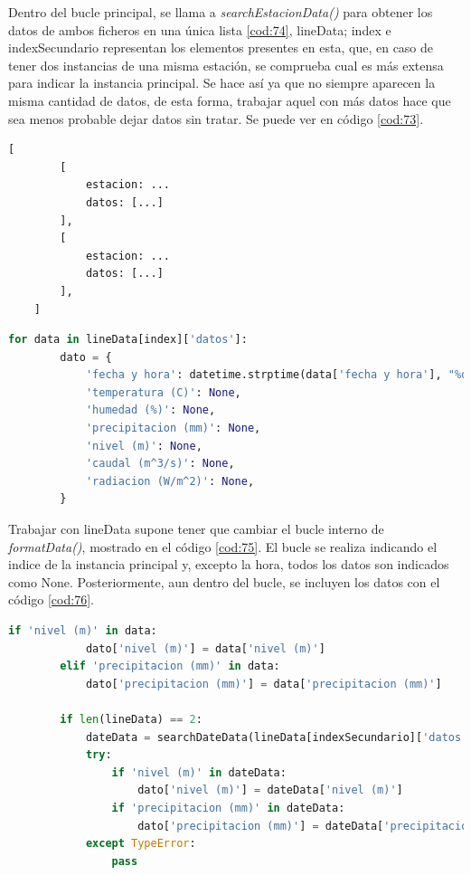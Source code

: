 Dentro del bucle principal, se llama a \textit{searchEstacionData()} para obtener los datos de ambos ficheros en una única lista \ref{cod:74}, lineData; index e indexSecundario representan los elementos presentes en esta, que, en caso de tener dos instancias de una misma estación, se comprueba cual es más extensa para indicar la instancia principal. Se hace así ya que no siempre aparecen la misma cantidad de datos, de esta forma, trabajar aquel con más datos hace que sea menos probable dejar datos sin tratar. Se puede ver en código \ref{cod:73}.

\begin{lstlisting}[language=Python, caption={Formato del diccionario lineData en caso de disponer de dos instancias de una misma estación}, label=cod:74]
	[
		[
			estacion: ...
			datos: [...]
		],
		[
			estacion: ...
			datos: [...]
		],
	]
\end{lstlisting}

\begin{lstlisting}[language=Python, caption={Modificación del bucle interno de \textit{formatData()}}, label=cod:75]
	for data in lineData[index]['datos']:
		dato = {
			'fecha y hora': datetime.strptime(data['fecha y hora'], "%d/%m/%Y %H:%M:%S").strftime("%Y-%m-%d %H:%M"),
			'temperatura (C)': None,
			'humedad (%)': None,
			'precipitacion (mm)': None,
			'nivel (m)': None,
			'caudal (m^3/s)': None,
			'radiacion (W/m^2)': None,
		}
\end{lstlisting}

Trabajar con lineData supone tener que cambiar el bucle interno de \textit{formatData()}, mostrado en el código \ref{cod:75}. El bucle se realiza indicando el indice de la instancia principal y, excepto la hora, todos los datos son indicados como None. Posteriormente, aun dentro del bucle, se incluyen los datos con el código \ref{cod:76}.

\begin{lstlisting}[language=Python, caption={Inclusion de los datos en el objeto JSON dato}, label=cod:76]
		if 'nivel (m)' in data:
			dato['nivel (m)'] = data['nivel (m)']
		elif 'precipitacion (mm)' in data:
			dato['precipitacion (mm)'] = data['precipitacion (mm)']
		
		if len(lineData) == 2:
			dateData = searchDateData(lineData[indexSecundario]['datos'], data['fecha y hora'])
			try:
				if 'nivel (m)' in dateData:
					dato['nivel (m)'] = dateData['nivel (m)']
				if 'precipitacion (mm)' in dateData:
					dato['precipitacion (mm)'] = dateData['precipitacion (mm)']
			except TypeError:
				pass
\end{lstlisting}

